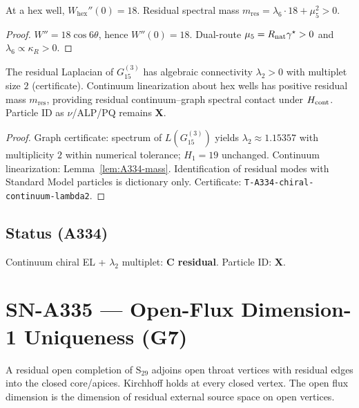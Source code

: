 \begin{lemma}
\label{lem:A334-mass}
At a hex well, $W_{\mathrm{hex}}''(0)=18$. Residual spectral mass
$m_{\mathrm{res}}=\lambda_6\cdot 18+\mu_5^2>0$.
\end{lemma}

\begin{proof}
$W''=18\cos 6\theta$, hence $W''(0)=18$. Dual-route $\mu_5=R_{\rm nat}\gamma^\star>0$ and $\lambda_6\propto\kappa_R>0$.
\end{proof}

\begin{theorem}
\label{thm:A334}
The residual Laplacian of $G_{15}^{(3)}$ has algebraic connectivity $\lambda_2>0$ with multiplet size $2$ (certificate). Continuum linearization about hex wells has positive residual mass $m_{\mathrm{res}}$, providing residual continuum--graph spectral contact under $H_{\rm cont}$. Particle ID as $\nu$/ALP/PQ remains \textbf{X}.
\end{theorem}

\begin{proof}
Graph certificate: spectrum of $L(G_{15}^{(3)})$ yields $\lambda_2\approx 1.15357$ with multiplicity $2$ within numerical tolerance; $H_1=19$ unchanged. Continuum linearization: Lemma~\ref{lem:A334-mass}. Identification of residual modes with Standard Model particles is dictionary only. Certificate: \texttt{T-A334-chiral-continuum-lambda2}.
\end{proof}

\subsection*{Status (A334)}
Continuum chiral EL + $\lambda_2$ multiplet: \textbf{C residual}. Particle ID: \textbf{X}.

\section{SN-A335 --- Open-Flux Dimension-1 Uniqueness (G7)}
\label{sec:SN-A335}

\begin{definition}
\label{def:A335-comp}
A residual open completion of $\mathrm{S}_{29}$ adjoins open throat vertices with residual edges into the closed core/apices. Kirchhoff holds at every closed vertex. The open flux dimension is the dimension of residual external source space on open vertices.
\end{definition}

